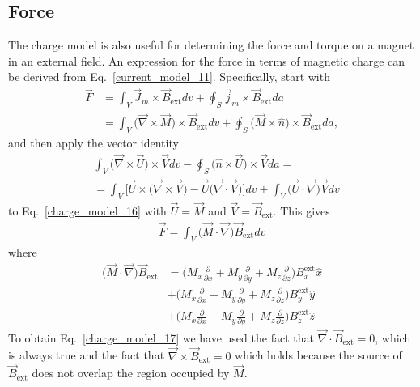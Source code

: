 \documentclass[12pt,a4paper,oneside]{book}
\begin{document}
\begin{onehalfspace}
\subsection{Force}
The charge model is also useful for determining the force and torque on a magnet in an external field. An expression for the force in terms of magnetic charge can be derived from Eq.~\eqref{current_model_11}. Specifically, start with 
\begin{equation}\label{charge_model_16}
	\begin{aligned}
		\vec{F} &= \int_{V} \vec{J}_m\times\vec{B}_{\text{ext}}dv+\oint_{S}\vec{j}_m\times\vec{B}_{\text{ext}}da \\[6pt]
		&= \int_{V}\Big(\vec{\nabla}\times\vec{M}\Big)\times\vec{B}_{\text{ext}}dv+\oint_{S}\Big(\vec{M}\times\hat{n}\Big)\times\vec{B}_{\text{ext}}da,
	\end{aligned}
\end{equation} 
and then apply the vector identity
\begin{equation*}\label{}
	\begin{aligned}
&\int_{V}\Big(\vec{\nabla}\times\vec{U}\Big)\times\vec{V}dv - \oint_{S}\Big(\hat{n}\times\vec{U}\Big)\times\vec{V}da = \\[6pt]
&=\int_{V}\Big[\vec{U}\times\Big(\vec{\nabla}\times\vec{V}\Big)-\vec{U}\Big(\vec{\nabla}\cdot\vec{V}\Big)\Big]dv + \int_{V}\Big(\vec{U}\cdot\vec{\nabla}\Big)\vec{V}dv		
	\end{aligned}
\end{equation*} 
to Eq.~\eqref{charge_model_16} with $\vec{U}=\vec{M}$ and $\vec{V}=\vec{B}_{\text{ext}}$.  This gives
\begin{equation}\label{charge_model_17}
	\begin{aligned}
		\vec{F} = \int_{V}\Big(\vec{M}\cdot\vec{\nabla}\Big)\vec{B}_{\text{ext}}dv
	\end{aligned}
\end{equation} 
where
\begin{equation*}\label{}
	\begin{aligned}
		\Big(\vec{M}\cdot\vec{\nabla}\Big)\vec{B}_{\text{ext}} &= \Biggl(M_x\frac{\partial}{\partial x}+M_y\frac{\partial}{\partial y}+M_z\frac{\partial}{\partial z}\Biggr)B^{\text{ext}}_x\hat{x} \\[6pt]
		&+\Biggl(M_x\frac{\partial}{\partial x}+M_y\frac{\partial}{\partial y}+M_z\frac{\partial}{\partial z}\Biggr)B^{\text{ext}}_y\hat{y} \\[6pt]
		&+\Biggl(M_x\frac{\partial}{\partial x}+M_y\frac{\partial}{\partial y}+M_z\frac{\partial}{\partial z}\Biggr)B^{\text{ext}}_z\hat{z}
	\end{aligned}
\end{equation*} 
To obtain Eq.~\eqref{charge_model_17} we have used the fact that $\vec{\nabla}\cdot\vec{B}_{\text{ext}}=0$, which is always true and the fact that $\vec{\nabla}\times\vec{B}_\text{ext}=0$ which holds because the source of $\vec{B}_\text{ext}$ does not overlap the region occupied by $\vec{M}$. 


\end{onehalfspace}
\end{document}
